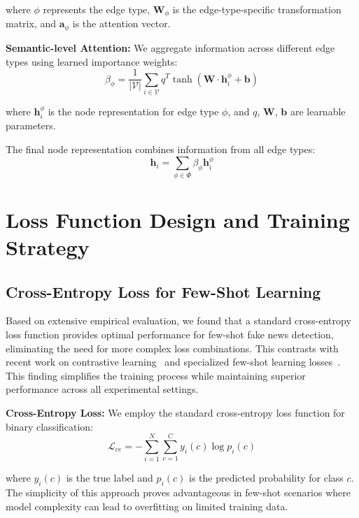 where $\phi$ represents the edge type, $\mathbf{W}_{\phi}$ is the edge-type-specific transformation matrix, and $\mathbf{a}_{\phi}$ is the attention vector.

\textbf{Semantic-level Attention:} We aggregate information across different edge types using learned importance weights:
\begin{equation}
\beta_{\phi} = \frac{1}{|\mathcal{V}|} \sum_{i \in \mathcal{V}} q^T \tanh(\mathbf{W} \cdot \mathbf{h}_i^{\phi} + \mathbf{b})
\end{equation}

where $\mathbf{h}_i^{\phi}$ is the node representation for edge type $\phi$, and $q$, $\mathbf{W}$, $\mathbf{b}$ are learnable parameters.

The final node representation combines information from all edge types:
\begin{equation}
\mathbf{h}_i = \sum_{\phi \in \Phi} \beta_{\phi} \mathbf{h}_i^{\phi}
\end{equation}

\section{Loss Function Design and Training Strategy}

\subsection{Cross-Entropy Loss for Few-Shot Learning}

Based on extensive empirical evaluation, we found that a standard cross-entropy loss function provides optimal performance for few-shot fake news detection, eliminating the need for more complex loss combinations. This contrasts with recent work on contrastive learning~\cite{chen2020simple, gao2021simcse} and specialized few-shot learning losses~\cite{snell2017prototypical}. This finding simplifies the training process while maintaining superior performance across all experimental settings.

\textbf{Cross-Entropy Loss:} We employ the standard cross-entropy loss function for binary classification:
\begin{equation}
\mathcal{L}_{ce} = -\sum_{i=1}^{N} \sum_{c=1}^{C} y_i(c) \log p_i(c)
\end{equation}

where $y_i(c)$ is the true label and $p_i(c)$ is the predicted probability for class $c$. The simplicity of this approach proves advantageous in few-shot scenarios where model complexity can lead to overfitting on limited training data.

